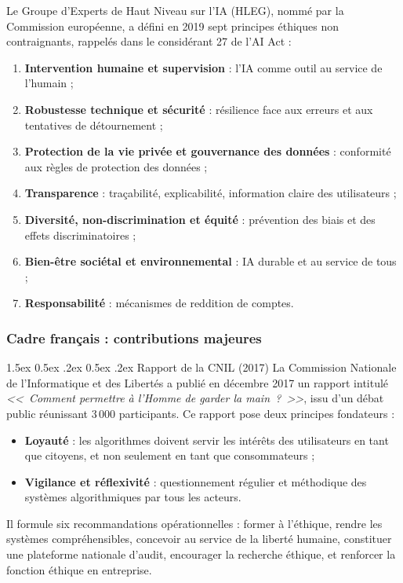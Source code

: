 \documentclass[12pt,a4paper]{article}
\makeatletter
\renewcommand\paragraph{\@startsection{paragraph}{4}{\z@}%
  {1.5ex \@plus 0.5ex \@minus .2ex}%
  {0.5ex \@plus .2ex}%
  {\normalfont\normalsize\bfseries}}
\makeatother
\begin{document}
Le Groupe d'Experts de Haut Niveau sur l'IA (HLEG), nommé par la Commission européenne, a défini en 2019 sept principes éthiques non contraignants, rappelés dans le considérant 27 de l'AI Act \cite{eu_hleg, ia_act} :
\begin{enumerate}
    \item \textbf{Intervention humaine et supervision} : l'IA comme outil au service de l'humain ;
    \item \textbf{Robustesse technique et sécurité} : résilience face aux erreurs et aux tentatives de détournement ;
    \item \textbf{Protection de la vie privée et gouvernance des données} : conformité aux règles de protection des données ;
    \item \textbf{Transparence} : traçabilité, explicabilité, information claire des utilisateurs ;
    \item \textbf{Diversité, non-discrimination et équité} : prévention des biais et des effets discriminatoires ;
    \item \textbf{Bien-être sociétal et environnemental} : IA durable et au service de tous ;
    \item \textbf{Responsabilité} : mécanismes de reddition de comptes.
\end{enumerate}

\subsubsection{Cadre français : contributions majeures}

\paragraph{Rapport de la CNIL (2017)}
La Commission Nationale de l'Informatique et des Libertés a publié en décembre 2017 un rapport intitulé \textit{<<~Comment permettre à l'Homme de garder la main~?~>>}, issu d'un débat public réunissant 3\,000 participants. Ce rapport pose deux principes fondateurs \cite{cnil_ethique} :
\begin{itemize}
    \item \textbf{Loyauté} : les algorithmes doivent servir les intérêts des utilisateurs en tant que citoyens, et non seulement en tant que consommateurs ;
    \item \textbf{Vigilance et réflexivité} : questionnement régulier et méthodique des systèmes algorithmiques par tous les acteurs.
\end{itemize}
Il formule six recommandations opérationnelles : former à l'éthique, rendre les systèmes compréhensibles, concevoir au service de la liberté humaine, constituer une plateforme nationale d'audit, encourager la recherche éthique, et renforcer la fonction éthique en entreprise.
\end{document}
